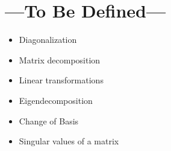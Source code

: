 
\chapter{---To Be Defined---}\label{tbd}
\begin{itemize}
  \item Diagonalization
  \item Matrix decomposition
  \item Linear transformations
  \item Eigendecomposition
  \item Change of Basis
  \item Singular values of a matrix
\end{itemize}
